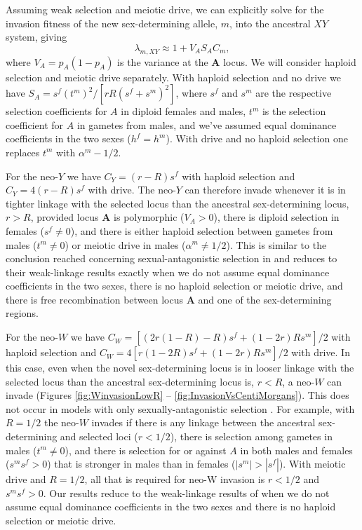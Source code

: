 \documentclass[12pt]{article}
\begin{document}
Assuming weak selection and meiotic drive, we can explicitly solve for the invasion fitness of the new sex-determining allele, $m$, into the ancestral $XY$ system, giving
\begin{equation}
\lambda_{m,XY} \approx 1 + V_A S_A C_m,
\end{equation}
where $V_A = p_A(1-p_A)$ is the variance at the \textbf{A} locus.
We will consider haploid selection and meiotic drive separately.
With haploid selection and no drive we have $S_A = s^f (t^m)^2 / \left[ r R \left( s^f + s^m \right)^2 \right]$, where $s^f$ and $s^m$ are the respective selection coefficients for $A$ in diploid females and males, $t^m$ is the selection coefficient for $A$ in gametes from males, and we've assumed equal dominance coefficients in the two sexes ($h^f = h^m$).
With drive and no haploid selection one replaces $t^m$ with $\alpha^m-1/2$.

For the neo-$Y$ we have $C_Y = (r - R)s^f $ with haploid selection and $C_Y = 4(r - R)s^f $ with drive.
The neo-$Y$ can therefore invade whenever it is in tighter linkage with the selected locus than the ancestral sex-determining locus, $r>R$, provided locus \textbf{A} is polymorphic ($V_A>0$), there is diploid selection in females ($s^f\neq0$), and there is either haploid selection between gametes from males ($t^m\neq0$) or meiotic drive in males ($\alpha^m\neq1/2$).
This is similar to the conclusion reached concerning sexual-antagonistic selection in \cite{vanDoorn:2007eu} and reduces to their weak-linkage results exactly when we do not assume equal dominance coefficients in the two sexes, there is no haploid selection or meiotic drive, and there is free recombination between locus \textbf{A} and one of the sex-determining regions.

For the neo-$W$ we have $C_W = [(2r(1-R)-R) s^f + (1-2r)R s^m]/2$ with haploid selection and $C_W = 4[r(1-2R) s^f + (1-2r)R s^m]/2$ with drive.
In this case, even when the novel sex-determining locus is in looser linkage with the selected locus than the ancestral sex-determining locus is, $r<R$, a neo-$W$ can invade (Figures \ref{fig:WinvasionLowR} -- \ref{fig:InvasionVsCentiMorgans}).
This does not occur in models with only sexually-antagonistic selection \citep{vanDoorn:2010hu}.
For example, with $R=1/2$ the neo-$W$ invades if there is any linkage between the ancestral sex-determining and selected loci ($r<1/2$), there is selection among gametes in males ($t^m\neq0$), and there is selection for or against $A$ in both males and females ($s^m s^f >0$) that is stronger in males than in females ($|s^m| > |s^f|$).
With meiotic drive and $R=1/2$, all that is required for neo-W invasion is $r<1/2$ and $s^m s^f >0$.
Our results reduce to the weak-linkage results of \cite[][Equation 3]{vanDoorn:2010hu} when we do not assume equal dominance coefficients in the two sexes and there is no haploid selection or meiotic drive.
\end{document}
